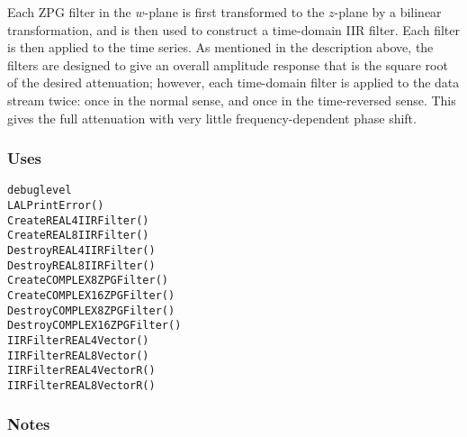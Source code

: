 Each ZPG filter in the $w$-plane is first transformed to the $z$-plane
by a bilinear transformation, and is then used to construct a
time-domain IIR filter.  Each filter is then applied to the time
series.  As mentioned in the description above, the filters are
designed to give an overall amplitude response that is the square root
of the desired attenuation; however, each time-domain filter is
applied to the data stream twice: once in the normal sense, and once
in the time-reversed sense.  This gives the full attenuation with very
little frequency-dependent phase shift.

\subsubsection{Uses}
\begin{verbatim}
debuglevel
LALPrintError()
CreateREAL4IIRFilter()
CreateREAL8IIRFilter()
DestroyREAL4IIRFilter()
DestroyREAL8IIRFilter()
CreateCOMPLEX8ZPGFilter()
CreateCOMPLEX16ZPGFilter()
DestroyCOMPLEX8ZPGFilter()
DestroyCOMPLEX16ZPGFilter()
IIRFilterREAL4Vector()
IIRFilterREAL8Vector()
IIRFilterREAL4VectorR()
IIRFilterREAL8VectorR()
\end{verbatim}

\subsubsection{Notes}

